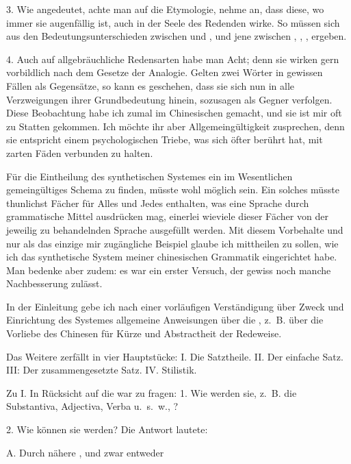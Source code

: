 3. Wie angedeutet, achte man auf die Etymologie, nehme an, dass diese, wo immer sie augenfällig ist, auch in der Seele des Redenden wirke. So müssen sich aus den Bedeutungsunterschieden zwischen  und ,  und  jene zwischen , , ,  ergeben.

4. Auch auf allgebräuchliche Redensarten habe man Acht; denn sie wirken gern vorbildlich nach dem Gesetze der Analogie. Gelten zwei Wörter in gewissen Fällen als Gegensätze, so kann es geschehen, dass sie sich nun in alle Verzweigungen ihrer Grundbedeutung hinein, sozusagen als Gegner verfolgen. Diese Beobachtung habe ich zumal im Chinesischen gemacht, und sie ist mir oft zu Statten gekommen. Ich möchte ihr aber Allgemeingültigkeit zusprechen, denn sie entspricht einem psychologischen Triebe,  was sich öfter berührt hat, mit zarten Fäden verbunden zu halten.

Für die Eintheilung des synthetischen Systemes ein im Wesentlichen gemeingültiges Schema zu finden, müsste wohl möglich sein. Ein solches müsste thunlichst Fächer für Alles und Jedes enthalten, was eine Sprache durch grammatische Mittel ausdrücken mag, einerlei wieviele dieser Fächer \label{fp.105} von der jeweilig zu behandelnden Sprache ausgefüllt werden. Mit diesem Vorbehalte und nur \label{sp.101} als das einzige mir zugängliche Beispiel glaube ich mittheilen zu sollen, wie ich das synthetische System meiner chinesischen Grammatik eingerichtet habe. Man bedenke aber zudem: es war ein erster Versuch, der gewiss noch manche Nachbesserung zulässt.

In der Einleitung gebe ich nach einer vorläufigen Verständigung über Zweck und Einrichtung des Systemes allgemeine Anweisungen über die , z.~B. über die Vorliebe des Chinesen für Kürze und Abstractheit der Redeweise.

Das Weitere zerfällt in vier Hauptstücke: I. Die Satztheile. II. Der einfache Satz. III: Der zusammengesetzte Satz. IV. Stilistik.

Zu I. In Rücksicht auf die  war zu fragen: 1. Wie werden sie, z.~B. die Substantiva, Adjectiva, Verba u.~s.~w., ?

2.  Wie können sie  werden? Die Antwort lautete:

\noindent A. Durch nähere , und zwar entweder

